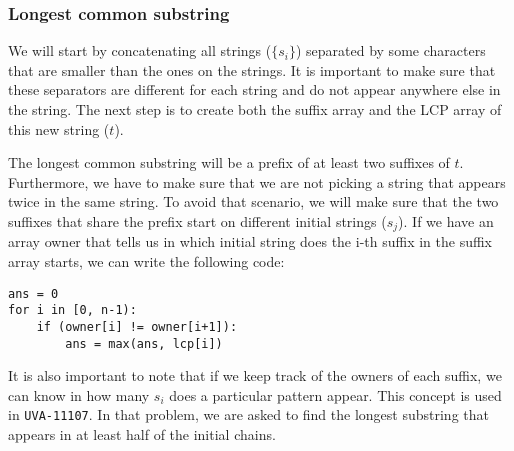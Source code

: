 \subsubsection{Longest common substring}
We will start by concatenating all strings ($\{s_i\}$) separated by some characters
that are smaller than the ones on the strings. It is important to make sure
that these separators are different for each string and do not appear anywhere
else in the string. The next step is to create both the suffix array and the
LCP array of this new string ($t$). 

The longest common substring will be a prefix of at least two suffixes of $t$. 
Furthermore, we have to make sure that we are not picking a string that 
appears twice in the same string. To avoid that scenario, we will make sure that
the two suffixes that share the prefix start on different initial strings ($s_j$). 
If we have an array owner that tells us in which initial string does the i-th suffix
in the suffix array starts, we can write the following code:
\begin{verbatim}
ans = 0
for i in [0, n-1):
	if (owner[i] != owner[i+1]):
		ans = max(ans, lcp[i])
\end{verbatim}

It is also important to note that if we keep track of the owners of each suffix,
we can know in how many $s_i$ does a particular pattern appear. This concept is
used in \texttt{UVA-11107}. In that problem, we are asked to find the longest 
substring that appears in at least half of the initial chains.

